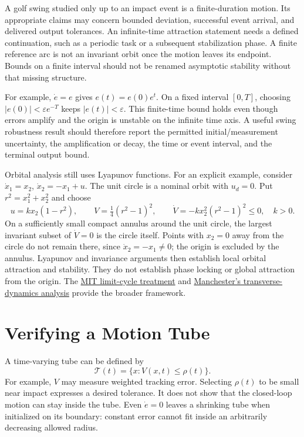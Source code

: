 \documentclass[12pt, openany]{book}
\theoremstyle{plain}
\begin{document}
A golf swing studied only up to an impact event is a finite-duration motion.
Its appropriate claims may concern bounded deviation, successful event arrival,
and delivered output tolerances. An infinite-time attraction statement needs
a defined continuation, such as a periodic task or a subsequent stabilization
phase. A finite reference arc is not an invariant orbit once the motion leaves
its endpoint. Bounds on a finite interval should not be renamed asymptotic
stability without that missing structure.

For example, $\dot e=e$ gives $e(t)=e(0)e^t$. On a fixed interval $[0,T]$,
choosing $|e(0)|<\varepsilon e^{-T}$ keeps $|e(t)|<\varepsilon$. This finite-time
bound holds even though errors amplify and the origin is unstable on the
infinite time axis. A useful swing robustness result should therefore report
the permitted initial/measurement uncertainty, the amplification or decay,
the time or event interval, and the terminal output bound.

Orbital analysis still uses Lyapunov functions. For an explicit example,
consider $\dot x_1=x_2$, $\dot x_2=-x_1+u$. The unit circle is a nominal orbit
with $u_d=0$. Put $r^2=x_1^2+x_2^2$ and choose
\begin{equation}
 u=kx_2(1-r^2),\qquad
 V=\tfrac14(r^2-1)^2,\qquad
 \dot V=-k x_2^2(r^2-1)^2\leq0,
 \quad k>0.
 \label{eq:motion_orbit_example}
\end{equation}
On a sufficiently small compact annulus around the unit circle, the largest
invariant subset of $\dot V=0$ is the circle itself. Points with $x_2=0$ away
from the circle do not remain there, since $\dot x_2=-x_1\ne0$; the origin is
excluded by the annulus. Lyapunov and invariance arguments then establish local
orbital attraction and stability. They do not establish phase locking or global
attraction from the origin. The
\href{https://underactuated.mit.edu/limit_cycles.html}{MIT limit-cycle treatment}
and \href{https://arxiv.org/abs/1010.2241}{Manchester's transverse-dynamics analysis}
provide the broader framework.

\section{Verifying a Motion Tube}

A time-varying tube can be defined by
\begin{equation}
 \mathcal T(t)=\{x:V(x,t)\leq\rho(t)\}.
 \label{eq:motion_tube}
\end{equation}
For example, $V$ may measure weighted tracking error. Selecting $\rho(t)$ to
be small near impact expresses a desired tolerance. It does not show that the
closed-loop motion can stay inside the tube. Even $\dot e=0$ leaves a shrinking
tube when initialized on its boundary: constant error cannot fit inside an
arbitrarily decreasing allowed radius.
\end{document}
